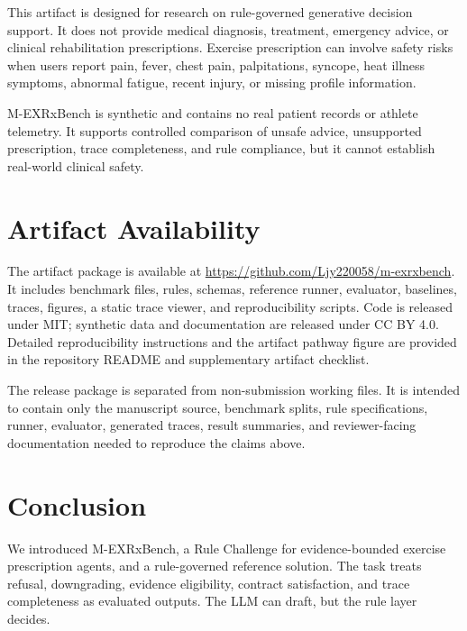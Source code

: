 \documentclass{ceurart}
\begin{document}
This artifact is designed for research on rule-governed generative decision support. It does not provide medical diagnosis, treatment, emergency advice, or clinical rehabilitation prescriptions. Exercise prescription can involve safety risks when users report pain, fever, chest pain, palpitations, syncope, heat illness symptoms, abnormal fatigue, recent injury, or missing profile information.

M-EXRxBench is synthetic and contains no real patient records or athlete telemetry. It supports controlled comparison of unsafe advice, unsupported prescription, trace completeness, and rule compliance, but it cannot establish real-world clinical safety.

\section{Artifact Availability}

The artifact package is available at
\url{https://github.com/Ljy220058/m-exrxbench}.
It includes benchmark
files, rules, schemas, reference runner, evaluator, baselines, traces, figures,
a static trace viewer, and reproducibility scripts. Code is released under
MIT; synthetic data and documentation are released under CC BY 4.0. Detailed reproducibility
instructions and the artifact pathway figure are provided in the repository
README and supplementary artifact checklist.

The release package is separated from non-submission working files. It is intended
to contain only the manuscript source, benchmark splits, rule specifications,
runner, evaluator, generated traces, result summaries, and reviewer-facing
documentation needed to reproduce the claims above.

\section{Conclusion}

We introduced M-EXRxBench, a Rule Challenge for evidence-bounded exercise prescription agents, and a rule-governed reference solution. The task treats refusal, downgrading, evidence eligibility, contract satisfaction, and trace completeness as evaluated outputs. The LLM can draft, but the rule layer decides.


\end{document}
